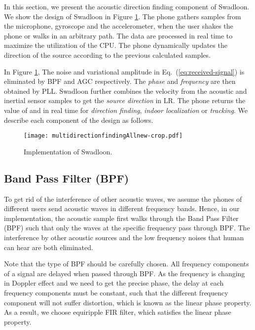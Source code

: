 \documentclass[]{sig-alternate-10pt}
\newcommand{\eqqref}[1]{Eq.~(\ref{#1})}
\def \ourprotocol{Swadloon\xspace}
\begin{document}
In this section, we present the acoustic direction finding component
 of \ourprotocol.
We show the design of \ourprotocol in Figure
\ref{fig:Calculating-the-direction}.  The phone gathers samples from the
microphone, gyroscope and the accelerometer, when the user shakes
the phone or walks in an arbitrary path. The data are processed in real time to
maximize the utilization of the CPU. The phone dynamically updates the
direction of the source according to the previous calculated samples.

In Figure \ref{fig:Calculating-the-direction}, The noise  and variational amplitude 
in \eqqref{eq:received-signal} is eliminated by BPF and AGC
respectively. The \textit{phase}  and \textit{frequency}  are then
obtained by PLL. \ourprotocol further combines the velocity from the acoustic and
inertial sensor samples to get the \textit{source direction}  in LR.
The phone  returns the value of   and  in real time for
\textit{direction finding}, \textit{indoor localization} or \textit{tracking}.  We describe each
component of the design as follows.
\begin{figure}[h]
\begin{centering}
\texttt{[image: multidirectionfindingAllnew-crop.pdf]}
\par\end{centering}
\caption{Implementation of \ourprotocol.}
\label{fig:Calculating-the-direction}
\end{figure}

\subsection{Band Pass Filter (BPF)}
To get rid of the interference of other acoustic waves, we assume
the phones of different users send acoustic waves in different frequency bands.
Hence, in our implementation, the acoustic sample first walks through
the Band Pass Filter (BPF) such that only the waves at the specific
frequency pass through BPF. The interference by other acoustic sources
and the low frequency noises that human can hear are both eliminated.

Note that the type of BPF should be carefully
chosen. All frequency components of a signal are delayed when passed
through BPF. As the frequency is changing in Doppler effect and we
need to get the precise phase, the delay at each frequency components
must be constant, such that the different frequency component will not
suffer distortion, which is known as the linear phase property. As
a result, we choose equiripple FIR filter, which
satisfies the linear phase property.
\end{document}
